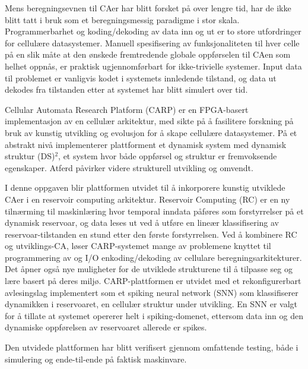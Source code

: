 Mens beregningsevnen til CAer har blitt forsket på over lengre tid, har de ikke
blitt tatt i bruk som et beregningsmessig paradigme i stor skala.
Programmerbarhet og koding/dekoding av data inn og ut er to store utfordringer
for cellulære datasystemer. Manuell spesifisering av funksjonaliteten til hver
celle på en slik måte at den ønskede fremtredende globale oppførselen til CAen
som helhet oppnås, er praktisk ugjennomførbart for ikke-trivielle systemer.
Input data til problemet er vanligvis kodet i systemets innledende tilstand, og
data ut dekodes fra tilstanden etter at systemet har blitt simulert over tid.

Cellular Automata Research Platform (CARP) er en FPGA-basert implementasjon av
en cellulær arkitektur, med sikte på å fasilitere forskning på bruk av kunstig
utvikling og evolusjon for å skape cellulære datasystemer. På et abstrakt nivå
implementerer plattforment et dynamisk system med dynamisk struktur (DS)$^2$, et
system hvor både oppførsel og struktur er fremvoksende egenskaper. Atferd
påvirker videre strukturell utvikling og omvendt.

I denne oppgaven blir plattformen utvidet til å inkorporere kunstig utviklede
CAer i en reservoir computing arkitektur. Reservoir Computing (RC) er en ny tilnærming til
maskinlæring hvor temporal inndata påføres som forstyrrelser på et dynamisk
reservoar, og data leses ut ved å utføre en lineær klassifisering av
reservoar-tilstanden en stund etter den første forstyrrelsen. Ved å kombinere RC
og utviklings-CA, løser CARP-systemet mange av problemene knyttet til
programmering av og I/O enkoding/dekoding av cellulare beregningsarkitekturer. Det
åpner også nye muligheter for de utviklede strukturene til å tilpasse seg og
lære basert på deres miljø. CARP-plattformen er utvidet med et rekonfigurerbart
avlesingslag implementert som et spiking neural network (SNN) som
klassifiserer dynamikken i reservoaret, en cellulær struktur under utvikling. En SNN er valgt for å
tillate at systemet opererer helt i spiking-domenet, ettersom data inn og den
dynamiske oppførelsen av reservoaret allerede er spikes.

Den utvidede plattformen har blitt verifisert gjennom omfattende testing, både i
simulering og ende-til-ende på faktisk maskinvare.

\cleardoublepage